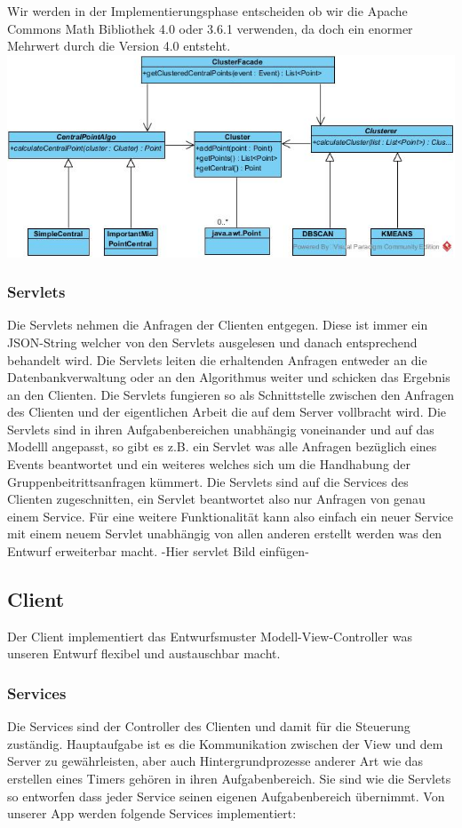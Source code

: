 Wir werden in der Implementierungsphase entscheiden ob wir die Apache Commons Math Bibliothek 4.0 oder 3.6.1 verwenden, da doch ein enormer Mehrwert durch die Version 4.0 entsteht.
  \newline
	\includegraphics[width=1\textwidth]{AlgorithmClassDiagram.jpg}

	\subsubsection{Servlets}
	Die Servlets nehmen die Anfragen der Clienten entgegen. Diese ist immer ein JSON-String welcher von den Servlets ausgelesen und danach entsprechend behandelt wird. Die Servlets leiten die erhaltenden Anfragen entweder an die Datenbankverwaltung oder an den Algorithmus weiter und schicken das Ergebnis an den Clienten.
Die Servlets fungieren so als Schnittstelle zwischen den Anfragen des Clienten und der eigentlichen Arbeit die auf dem Server vollbracht wird. 
Die Servlets sind in ihren Aufgabenbereichen unabhängig voneinander und auf das Modelll angepasst, so gibt es z.B. ein Servlet was alle Anfragen bezüglich eines Events beantwortet und ein weiteres welches sich um die Handhabung der Gruppenbeitrittsanfragen kümmert.
Die Servlets sind auf die Services des Clienten zugeschnitten, ein Servlet beantwortet also nur Anfragen von genau einem Service.
Für eine weitere Funktionalität kann also einfach ein neuer Service mit einem neuem Servlet unabhängig von allen anderen erstellt werden was den Entwurf erweiterbar macht.   
-Hier servlet Bild einfügen-

	\subsection{Client}
	Der Client implementiert das Entwurfsmuster Modell-View-Controller was unseren Entwurf flexibel und austauschbar macht.
	\subsubsection{Services}
	Die Services sind der Controller des Clienten und damit für die Steuerung zuständig. Hauptaufgabe ist es die Kommunikation zwischen der View und dem Server zu gewährleisten, aber auch Hintergrundprozesse anderer Art wie das erstellen eines Timers gehören in ihren Aufgabenbereich.
Sie sind wie die Servlets so entworfen dass jeder Service seinen eigenen Aufgabenbereich übernimmt.
Von unserer App werden folgende Services implementiert:


